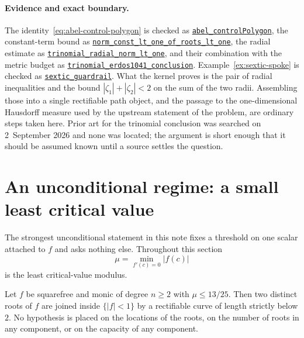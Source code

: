 \paragraph{Evidence and exact boundary.}
\label{bdry:trinomial}
The identity~\eqref{eq:abel-control-polygon} is checked as
\href{https://github.com/wcook04/plectis-erdos/blob/0ba585f632fbbbb43af2ee9532d4e83752af3f67/ErdosProblems/Erdos1041/AbelControlPolygon.lean\#L123}{\texttt{abel\_controlPolygon}}, the
constant-term bound as
\href{https://github.com/wcook04/plectis-erdos/blob/0ba585f632fbbbb43af2ee9532d4e83752af3f67/ErdosProblems/Erdos1041/AbelControlPolygon.lean\#L258}{\texttt{norm\_const\_lt\_one\_of\_roots\_lt\_one}},
the radial estimate as
\href{https://github.com/wcook04/plectis-erdos/blob/0ba585f632fbbbb43af2ee9532d4e83752af3f67/ErdosProblems/Erdos1041/AbelControlPolygon.lean\#L219}{\texttt{trinomial\_radial\_norm\_lt\_one}},
and their combination with the metric budget as
\href{https://github.com/wcook04/plectis-erdos/blob/0ba585f632fbbbb43af2ee9532d4e83752af3f67/ErdosProblems/Erdos1041/AbelControlPolygon.lean\#L330}{\texttt{trinomial\_erdos1041\_conclusion}}.
Example~\ref{ex:sextic-spoke} is checked as
\href{https://github.com/wcook04/plectis-erdos/blob/0ba585f632fbbbb43af2ee9532d4e83752af3f67/ErdosProblems/Erdos1041/AbelControlPolygon.lean\#L555}{\texttt{sextic\_guardrail}}.  What the
kernel proves is the pair of radial inequalities and the bound
$|\zeta_1|+|\zeta_2|<2$ on the sum of the two radii.  Assembling those into a
single rectifiable path object, and the passage to the one-dimensional
Hausdorff measure used by the upstream statement of the problem, are ordinary
steps taken here.  Prior art for the trinomial conclusion was searched on
2~September 2026 and none was located; the argument is short enough that it
should be assumed known until a source settles the question.

\section{An unconditional regime: a small least critical value}
\label{sec:low-critical-closure}

The strongest unconditional statement in this note fixes a threshold on one
scalar attached to $f$ and asks nothing else.  Throughout this section
\[
 \mu=\min_{f'(c)=0}|f(c)|
\]
is the least critical-value modulus.

\begin{theorem}
\label{res:low-critical-thirteen-twentyfifths}
Let $f$ be squarefree and monic of degree $n\ge2$ with $\mu\le13/25$.  Then
two distinct roots of $f$ are joined inside $\{|f|<1\}$ by a rectifiable
curve of length strictly below $2$.  No hypothesis is placed on the locations
of the roots, on the number of roots in any component, or on the capacity of
any component.
\end{theorem}

